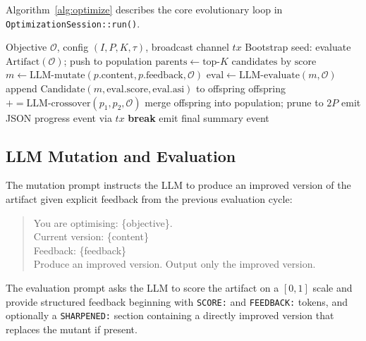 \documentclass[11pt]{article}
\begin{document}
Algorithm~\ref{alg:optimize} describes the core evolutionary loop in
\texttt{OptimizationSession::run()}.

\begin{algorithm}[H]
\caption{OptimizeAnything Evolutionary Loop}
\label{alg:optimize}
\begin{algorithmic}[1]
\Require Objective $\mathcal{O}$, config $(I, P, K, \tau)$, broadcast channel $\mathit{tx}$
\State Bootstrap seed: evaluate $\text{Artifact}(\mathcal{O})$; push to population
  \State $\text{parents} \leftarrow \text{top-}K \text{ candidates by score}$
    \State $m \leftarrow \text{LLM-mutate}(p.\text{content}, p.\text{feedback}, \mathcal{O})$
    \State $\text{eval} \leftarrow \text{LLM-evaluate}(m, \mathcal{O})$
    \State append $\text{Candidate}(m, \text{eval.score}, \text{eval.asi})$ to offspring
  \EndFor
    \State offspring $\mathrel{+}= \text{LLM-crossover}(p_1, p_2, \mathcal{O})$
  \EndIf
  \State merge offspring into population; prune to $2P$
  \State emit JSON progress event via $\mathit{tx}$
    \State \textbf{break} 
  \EndIf
\EndFor
\State emit final summary event
\end{algorithmic}
\end{algorithm}

\subsection{LLM Mutation and Evaluation}

The mutation prompt instructs the LLM to produce an improved version of the
artifact given explicit feedback from the previous evaluation cycle:
\begin{quote}
\small\ttfamily
You are optimising: \{objective\}.\\
Current version: \{content\}\\
Feedback: \{feedback\}\\
Produce an improved version. Output only the improved version.
\end{quote}

The evaluation prompt asks the LLM to score the artifact on a $[0,1]$ scale
and provide structured feedback beginning with \texttt{SCORE:} and
\texttt{FEEDBACK:} tokens, and optionally a \texttt{SHARPENED:} section
containing a directly improved version that replaces the mutant if present.
\end{document}
